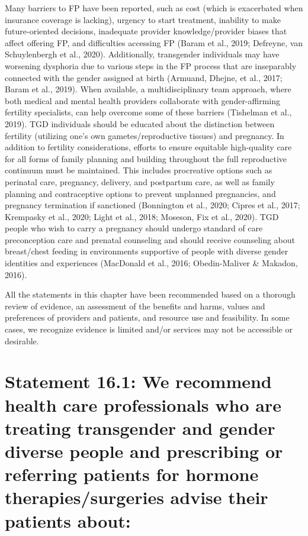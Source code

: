 \documentclass[
]{book}
\begin{document}
Many barriers to FP have been reported, such
as cost (which is exacerbated when insurance
coverage is lacking), urgency to start treatment,
inability to make future-oriented decisions, inadequate provider knowledge/provider biases that
affect offering FP, and difficulties accessing FP
(Baram et al., 2019; Defreyne, van Schuylenbergh
et al., 2020). Additionally, transgender individuals may have worsening dysphoria due to various
steps in the FP process that are inseparably connected with the gender assigned at birth
(Armuand, Dhejne, et al., 2017; Baram et al.,
2019). When available, a multidisciplinary team
approach, where both medical and mental health
providers collaborate with gender-affirming fertility specialists, can help overcome some of
these barriers (Tishelman et al., 2019). TGD
individuals should be educated about the distinction between fertility (utilizing one's own
gametes/reproductive tissues) and pregnancy. In
addition to fertility considerations, efforts to
ensure equitable high-quality care for all forms
of family planning and building throughout the
full reproductive continuum must be maintained.
This includes procreative options such as perinatal care, pregnancy, delivery, and postpartum
care, as well as family planning and contraceptive
options to prevent unplanned pregnancies, and
pregnancy termination if sanctioned (Bonnington
et al., 2020; Cipres et al., 2017; Krempasky et al.,
2020; Light et al., 2018; Moseson, Fix et al.,
2020). TGD people who wish to carry a pregnancy should undergo standard of care preconception care and prenatal counseling and
should receive counseling about breast/chest
feeding in environments supportive of people
with diverse gender identities and experiences
(MacDonald et al., 2016; Obedin-Maliver \&
Makadon, 2016).

All the statements in this chapter have been
recommended based on a thorough review of
evidence, an assessment of the benefits and
harms, values and preferences of providers and
patients, and resource use and feasibility. In some
cases, we recognize evidence is limited and/or
services may not be accessible or desirable.

\hypertarget{statement-16.1-we-recommend-health-care-professionals-who-are-treating-transgender-and-gender-diverse-people-and-prescribing-or-referring-patients-for-hormone-therapiessurgeries-advise-their-patients-about}{%
\section*{Statement 16.1: We recommend health care professionals who are treating transgender and gender diverse people and prescribing or referring patients for hormone therapies/surgeries advise their patients about:}\label{statement-16.1-we-recommend-health-care-professionals-who-are-treating-transgender-and-gender-diverse-people-and-prescribing-or-referring-patients-for-hormone-therapiessurgeries-advise-their-patients-about}}
\end{document}
